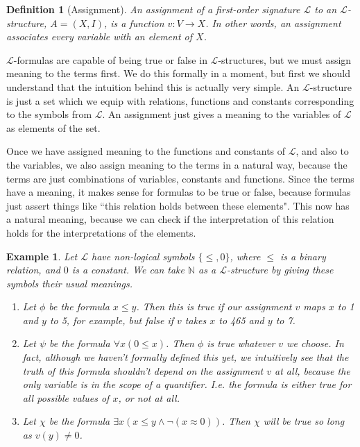 \documentclass{article}
\theoremstyle{plain}
\newtheorem{definition}[theorem]{Definition}{\bfseries}{\upshape}
\newtheorem{example}[theorem]{Example}{\bfseries}{\upshape}
\newcommand{\bN}{\mathbb{N}}
\newcommand{\sL}{\mathscr{L}}
\begin{document}
\begin{definition}[Assignment]
An \emph{assignment} of a first-order signature $\sL$ to an $\sL$-structure, $A=(X,I)$, is a function $v:V\to X$. In other words, an assignment associates every variable with an element of $X$.  
\end{definition}

$\sL$-formulas are capable of being true or false in $\sL$-structures, but we must assign meaning to the terms first. We do this formally in a moment, but first we should understand that the intuition behind this is actually very simple. An $\sL$-structure is just a set which we equip with relations, functions and constants corresponding to the symbols from $\sL$. An assignment just gives a meaning to the variables of $\sL$ as elements of the set. 

Once we have assigned meaning to the functions and constants of $\sL$, and also to the variables, we also assign meaning to the terms in a natural way, because the terms are just combinations of variables, constants and functions. Since the terms have a meaning, it makes sense for formulas to be true or false, because formulas just assert things like ``this relation holds between these elements". This now has a natural meaning, because we can check if the interpretation of this relation holds for the interpretations of the elements.

\begin{example}
Let $\sL$ have non-logical symbols $\{\leq, 0\}$, where $\leq$ is a binary relation, and $0$ is a constant. We can take $\bN$ as a $\sL$-structure by giving these symbols their usual meanings. 
\begin{enumerate}
\item Let $\phi$ be the formula $x\leq y$. Then this is true if our assignment $v$ maps $x$ to 1 and $y$ to 5, for example, but false if $v$ takes $x$ to 465 and $y$ to 7.  
\item Let $\psi$ be the formula $\forall x(0\leq x)$. Then $\phi$ is true whatever $v$ we choose. In fact, although we haven't formally defined this yet, we intuitively see that the truth of this formula shouldn't depend on the assignment $v$ at all, because the only variable is in the scope of a quantifier. I.e. the formula is either true \emph{for all} possible values of $x$, or not at all. 
\item Let $\chi$ be the formula $\exists x(x\leq y \wedge \neg(x\approx 0))$. Then $\chi$ will be true so long as $v(y)\neq 0$.
\end{enumerate}
\end{example} 
\end{document}
